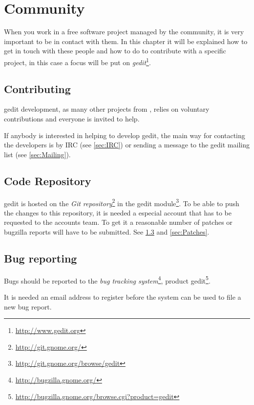 
\chapter{Community}\label{chap:community}

When you work in a free software project managed by the community, it is very important to be in contact with them. In this chapter it will be explained how to get in touch with these people and how to do to contribute with a specific project, in this case a focus will be put on \emph{gedit}\footnote{\url{http://www.gedit.org}}.

\section{Contributing}\label{sec:Contributing}

gedit development, as many other projects from \GNOME, relies on voluntary contributions and everyone is invited to help.

If anybody is interested in helping to develop gedit, the main way for contacting the developers is by IRC (see \ref{sec:IRC}) or sending a message to the gedit mailing list (see \ref{sec:Mailing}).

\section{Code Repository}\label{sec:Repository}

gedit is hosted on the \emph{\GNOME Git repository}\footnote{\url{http://git.gnome.org/}} in the gedit module\footnote{\url{http://git.gnome.org/browse/gedit}}. To be able to push the changes to this repository, it is needed a especial account that has to be requested to the \GNOME accounts team. To get it a reasonable number of patches or bugzilla reports will have to be submitted. See \ref{sec:Bugs} and \ref{sec:Patches}.

\section{Bug reporting}\label{sec:Bugs}

Bugs should be reported to the \emph{\GNOME bug tracking system}\footnote{\url{http://bugzilla.gnome.org/}}, product gedit\footnote{\url{http://bugzilla.gnome.org/browse.cgi?product=gedit}}.

It is needed an email address to register before the system can be used to file a new bug report.

